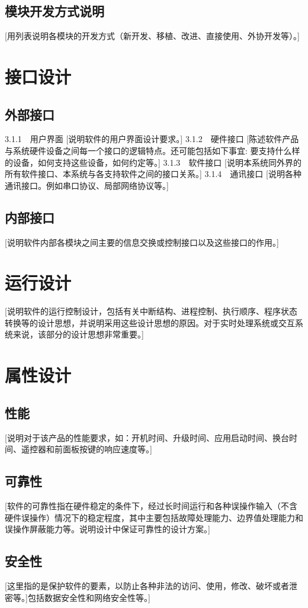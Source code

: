 \documentclass[12pt,a4paper,UTF-8]{ctexart}
\begin{document}
	\subsection{模块开发方式说明}
		[用列表说明各模块的开发方式（新开发、移植、改进、直接使用、外协开发等）。]
\section{接口设计}
	\subsection{外部接口}
		3.1.1　用户界面
[说明软件的用户界面设计要求。]
3.1.2　硬件接口
[陈述软件产品与系统硬件设备之间每一个接口的逻辑特点。还可能包括如下事宜: 要支持什么样的设备，如何支持这些设备，如何约定等。]
3.1.3　软件接口
[说明本系统同外界的所有软件接口、本系统与各支持软件之间的接口关系。]
3.1.4　通讯接口
[说明各种通讯接口。例如串口协议、局部网络协议等。]
	\subsection{内部接口}
		[说明软件内部各模块之间主要的信息交换或控制接口以及这些接口的作用。]
\section{运行设计}
		[说明软件的运行控制设计，包括有关中断结构、进程控制、执行顺序、程序状态转换等的设计思想，并说明采用这些设计思想的原因。对于实时处理系统或交互系统来说，该部分的设计思想非常重要。]
\section{属性设计}
      	\subsection{性能}
		 [说明对于该产品的性能要求，如：开机时间、升级时间、应用启动时间、换台时间、遥控器和前面板按键的响应速度等。]
	\subsection{可靠性}
		[软件的可靠性指在硬件稳定的条件下，经过长时间运行和各种误操作输入（不含硬件误操作）情况下的稳定程度，其中主要包括故障处理能力、边界值处理能力和误操作屏蔽能力等。说明设计中保证可靠性的设计方案。]
	\subsection{安全性}
		[这里指的是保护软件的要素，以防止各种非法的访问、使用，修改、破坏或者泄密等。]包括数据安全性和网络安全性等。]
\end{document}
